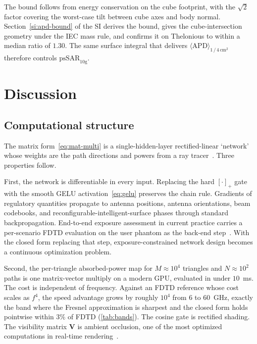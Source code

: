 \documentclass[journal,twocolumn,10pt]{IEEEtran}
\theoremstyle{plain}
\newcommand{\APDAvg}{\langle\mathrm{APD}\rangle_{1\,/\,4\,\mathrm{cm}^2}}
\begin{document}
The bound follows from energy conservation on the cube footprint,
with the $\sqrt{2}$ factor covering the worst-case tilt between cube
axes and body normal. Section~\ref{si:apd-bound} of the SI derives the bound,
gives the cube-intersection geometry under the IEC mass rule, and
confirms it on Thelonious to within a median ratio of $1.30$. The same
surface integral that delivers $\APDAvg$ therefore controls
$\mathrm{psSAR}_{10\mathrm{g}}$.

\section{Discussion}\label{sec:disc}

\subsection{Computational structure}\label{subsec:disc-primitives}

The matrix form~\eqref{eq:mat-multi} is a single-hidden-layer
rectified-linear `network' whose weights are the path directions and
powers from a ray tracer~\cite{SionnaRT}. Three properties follow.

First, the network is differentiable in every input. Replacing the
hard $[\cdot]_+$ gate with the smooth \gls{GELU}
activation~\eqref{eq:gelu} preserves the chain rule. Gradients of
regulatory quantities propagate to antenna positions, antenna
orientations, beam codebooks, and reconfigurable-intelligent-surface
phases through standard backpropagation. End-to-end exposure
assessment in current practice carries a per-scenario FDTD
evaluation on the user phantom as the back-end
step~\cite{Wydaeghe2022access,Wydaeghe2026npj}. With the closed form
replacing that step, exposure-constrained network design becomes a
continuous optimization problem.

Second, the per-triangle absorbed-power map for $M \approx 10^4$
triangles and $N \approx 10^2$ paths is one matrix-vector multiply on
a modern GPU, evaluated in under $10$~ms. The cost is independent of
frequency. Against an FDTD reference whose cost scales as $f^4$, the
speed advantage grows by roughly $10^4$ from $6$ to $60$~GHz, exactly
the band where the Fresnel approximation is sharpest and the closed
form holds pointwise within $3\%$ of FDTD (\cref{tab:bands}). The
cosine gate is rectified shading. The visibility matrix $\mathbf{V}$
is ambient occlusion, one of the most optimized computations in
real-time rendering~\cite{AkenineMoller2018}.
\end{document}
